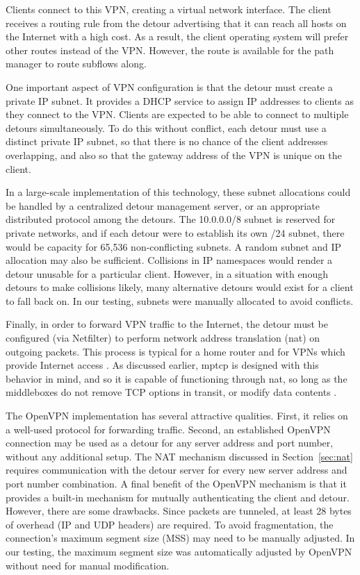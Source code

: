 \documentclass{cwru}
\begin{document}
Clients connect to this VPN, creating a virtual network interface. The client
receives a routing rule from the detour advertising that it can reach all hosts
on the Internet with a high cost. As a result, the client operating system will
prefer other routes instead of the VPN. However, the route is available for the
path manager to route subflows along.

One important aspect of VPN configuration is that the detour must create a
private IP subnet. It provides a DHCP service \cite{rfc2131} to assign IP
addresses to clients as they connect to the VPN. Clients are expected to be able
to connect to multiple detours simultaneously. To do this without conflict, each
detour must use a distinct private IP subnet, so that there is no chance of the
client addresses overlapping, and also so that the gateway address of the VPN is
unique on the client.

In a large-scale implementation of this technology, these subnet allocations
could be handled by a centralized detour management server, or an appropriate
distributed protocol among the detours. The 10.0.0.0/8 subnet is reserved for
private networks, and if each detour were to establish its own /24 subnet, there
would be capacity for 65,536 non-conflicting subnets. A random subnet and IP
allocation may also be sufficient. Collisions in IP namespaces would render a
detour unusable for a particular client. However, in a situation with enough
detours to make collisions likely, many alternative detours would exist for a
client to fall back on. In our testing, subnets were manually allocated to avoid
conflicts.

Finally, in order to forward VPN traffic to the Internet, the detour must be
configured (via Netfilter) to perform network address translation (\ac{nat}) on
outgoing packets. This process is typical for a home router and for VPNs which
provide Internet access \cite{rfc3022,yonan2007openvpn}. As discussed earlier,
\ac{mptcp} is designed with this behavior in mind, and so it is capable of
functioning through \ac{nat}, so long as the middleboxes do not remove TCP
options in transit, or modify data contents \cite{rfc6182}.

The OpenVPN implementation has several attractive qualities. First, it relies on
a well-used protocol for forwarding traffic. Second, an established OpenVPN
connection may be used as a detour for any server address and port number,
without any additional setup. The NAT mechanism discussed in
Section~\ref{sec:nat} requires communication with the detour server for every
new server address and port number combination. A final benefit of the OpenVPN
mechanism is that it provides a built-in mechanism for mutually authenticating
the client and detour. However, there are some drawbacks. Since packets are
tunneled, at least 28 bytes of overhead (IP and UDP headers) are required. To
avoid fragmentation, the connection's maximum segment size (MSS) may need to be
manually adjusted. In our testing, the maximum segment size was automatically
adjusted by OpenVPN without need for manual modification.
\end{document}
